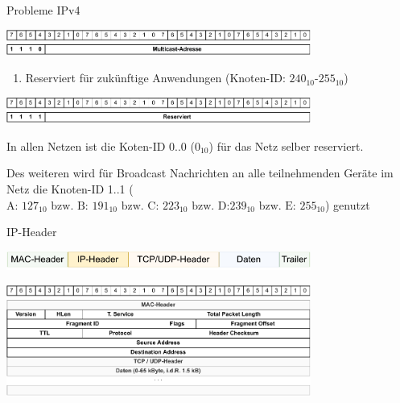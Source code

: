 \begin{bonus}{Probleme IPv4}
    \begin{center}
        \includegraphics[width=0.75\textwidth]{includes/figures/bonus_class_d.pdf}
    \end{center}

    \begin{enumerate}[label=Class \Alph*:, leftmargin=*, start=5]
        \item Reserviert für zukünftige Anwendungen (Knoten-ID: $240_{10}\text{-}255_{10}$)
    \end{enumerate}

    \begin{center}
        \includegraphics[width=0.75\textwidth]{includes/figures/bonus_class_e.pdf}
    \end{center}

    In allen Netzen ist die Koten-ID 0..0 ($0_{10}$) für das Netz selber reserviert.

    Des weiteren wird für Broadcast Nachrichten an alle teilnehmenden Geräte im Netz die Knoten-ID 1..1 ($\text{A: } 127_{10} \text{ bzw. B: } 191_{10} \text{ bzw. C: } 223_{10} \text{ bzw.  D:} 239_{10} \text{ bzw. E: } 255_{10}$) genutzt
\end{bonus}

\begin{defi}{IP-Header}
    \begin{center}
        \includegraphics[width=0.75\textwidth]{includes/figures/defi_ip_header_kapselung.pdf}

        \includegraphics[width=0.75\textwidth]{includes/figures/defi_ip_header.pdf}
    \end{center}
\end{defi}